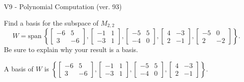 \begin{exercise}
  \begin{exerciseTitle}V9 - Polynomial Computation (ver. 93)\end{exerciseTitle}
  \begin{exerciseStatement}
    Find a basis for the subspace of \(M_{2,2}\) 
\[W=\mathrm{span}\ \left\{\left[\begin{array}{cc}
-6 & 5 \\
3 & -6
\end{array}\right] , \left[\begin{array}{cc}
-1 & 1 \\
-3 & 1
\end{array}\right] , \left[\begin{array}{cc}
-5 & 5 \\
-4 & 0
\end{array}\right] , \left[\begin{array}{cc}
4 & -3 \\
2 & -1
\end{array}\right] , \left[\begin{array}{cc}
-5 & 0 \\
2 & -2
\end{array}\right]\right\}.\]
 Be sure to explain why your result is a basis.


  \end{exerciseStatement}
  \begin{exerciseAnswer}
   A basis of \(W\) is  \(\left\{\left[\begin{array}{cc}
-6 & 5 \\
3 & -6
\end{array}\right] , \left[\begin{array}{cc}
-1 & 1 \\
-3 & 1
\end{array}\right] , \left[\begin{array}{cc}
-5 & 5 \\
-4 & 0
\end{array}\right] , \left[\begin{array}{cc}
4 & -3 \\
2 & -1
\end{array}\right]\right\}\).
  


  \end{exerciseAnswer}
\end{exercise}